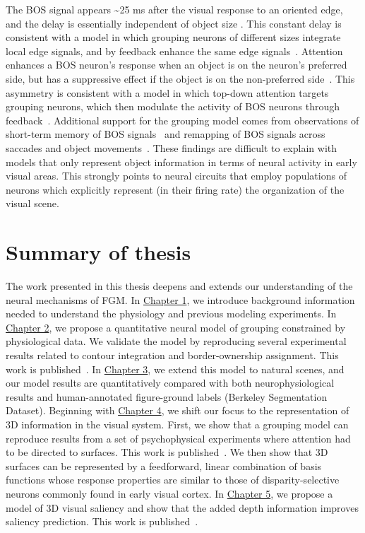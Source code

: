 The BOS signal appears \textasciitilde 25 ms after the visual response to an oriented edge, and the delay is essentially independent of object size \citep{Zhou_etal00}. This constant delay is consistent with a model in which grouping neurons of different sizes integrate local edge signals, and by feedback enhance the same edge  signals~\citep{Craft_etal07}. Attention enhances a BOS neuron's response when an object is on the neuron's preferred side, but has a suppressive effect if the object is on the non-preferred side~\citep{Qiu_etal07}. This asymmetry is consistent with a model in which top-down attention targets grouping neurons, which then modulate the activity of BOS neurons through feedback~\citep{Mihalas_etal11b}. Additional support for the grouping model comes from observations of short-term memory of BOS signals~\citep{OHerron_vonderHeydt09} and remapping of BOS signals across saccades and object movements~\citep{OHerron_vonderHeydt13}. These findings are difficult to explain with models that only represent object information in terms of neural activity in early visual areas. This strongly points to neural circuits that employ populations of neurons which explicitly represent (\ie in their firing rate) the organization of the visual scene.

\section{Summary of thesis} %

The work presented in this thesis deepens and extends our understanding of the neural mechanisms of FGM. In \hyperref[sec:intro]{Chapter 1}, we introduce background information needed to understand the physiology and previous modeling experiments. In \hyperref[sec:contour_chapter]{Chapter 2}, we propose a quantitative neural model of grouping constrained by physiological data. We validate the model by reproducing several experimental results related to contour integration and border-ownership assignment. This work is published~\citep{Hu_Niebur17}. In \hyperref[sec:natural_image]{Chapter 3}, we extend this model to natural scenes, and our model results are quantitatively compared with both neurophysiological results and human-annotated figure-ground labels (Berkeley Segmentation Dataset). Beginning with \hyperref[sec:surfaces]{Chapter 4}, we shift our focus to the representation of 3D information in the visual system. First, we show that a grouping model can reproduce results from a set of psychophysical experiments where attention had to be directed to surfaces. This work is published~\citep{Hu_etal15a}. We then show that 3D surfaces can be represented by a feedforward, linear combination of basis functions whose response properties are similar to those of disparity-selective neurons commonly found in early visual cortex. In \hyperref[sec:saliency]{Chapter 5}, we propose a model of 3D visual saliency and show that the added depth information improves saliency prediction. This work is published~\citep{Hu_etal16a}.

